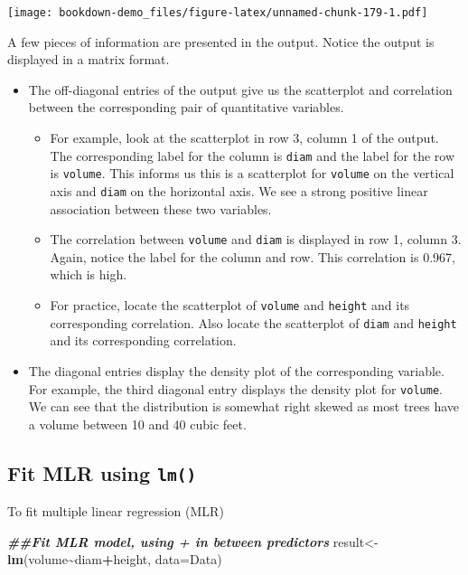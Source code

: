\documentclass[
]{book}
\newenvironment{Shaded}{\begin{snugshade}}{\end{snugshade}}
\newcommand{\AttributeTok}[1]{\textcolor[rgb]{0.13,0.29,0.53}{#1}}
\newcommand{\DocumentationTok}[1]{\textcolor[rgb]{0.56,0.35,0.01}{\textbf{\textit{#1}}}}
\newcommand{\FunctionTok}[1]{\textcolor[rgb]{0.13,0.29,0.53}{\textbf{#1}}}
\newcommand{\NormalTok}[1]{#1}
\newcommand{\OtherTok}[1]{\textcolor[rgb]{0.56,0.35,0.01}{#1}}
\newcommand{\SpecialCharTok}[1]{\textcolor[rgb]{0.81,0.36,0.00}{\textbf{#1}}}
\providecommand{\tightlist}{%
  \setlength{\itemsep}{0pt}\setlength{\parskip}{0pt}}
\begin{document}
\texttt{[image: bookdown-demo\_files/figure-latex/unnamed-chunk-179-1.pdf]}

A few pieces of information are presented in the output. Notice the output is displayed in a matrix format.

\begin{itemize}
\tightlist
\item
  The off-diagonal entries of the output give us the scatterplot and correlation between the corresponding pair of quantitative variables.

  \begin{itemize}
  \tightlist
  \item
    For example, look at the scatterplot in row 3, column 1 of the output. The corresponding label for the column is \texttt{diam} and the label for the row is \texttt{volume}. This informs us this is a scatterplot for \texttt{volume} on the vertical axis and \texttt{diam} on the horizontal axis. We see a strong positive linear association between these two variables.
  \item
    The correlation between \texttt{volume} and \texttt{diam} is displayed in row 1, column 3. Again, notice the label for the column and row. This correlation is 0.967, which is high.
  \item
    For practice, locate the scatterplot of \texttt{volume} and \texttt{height} and its corresponding correlation. Also locate the scatterplot of \texttt{diam} and \texttt{height} and its corresponding correlation.
  \end{itemize}
\item
  The diagonal entries display the density plot of the corresponding variable. For example, the third diagonal entry displays the density plot for \texttt{volume}. We can see that the distribution is somewhat right skewed as most trees have a volume between 10 and 40 cubic feet.
\end{itemize}

\hypertarget{fit-mlr-using-lm}{%
\subsection*{\texorpdfstring{Fit MLR using \texttt{lm()}}{Fit MLR using lm()}}\label{fit-mlr-using-lm}}

To fit multiple linear regression (MLR)

\begin{Shaded}
\begin{Highlighting}[]
\DocumentationTok{\#\#Fit MLR model, using + in between predictors}
\NormalTok{result}\OtherTok{\textless{}{-}}\FunctionTok{lm}\NormalTok{(volume}\SpecialCharTok{\textasciitilde{}}\NormalTok{diam}\SpecialCharTok{+}\NormalTok{height, }\AttributeTok{data=}\NormalTok{Data)}
\end{Highlighting}
\end{Shaded}
\end{document}
